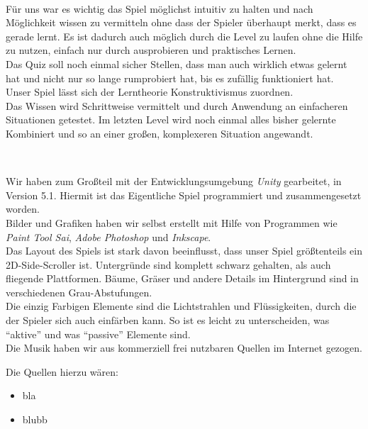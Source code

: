 \documentclass[10pt,a4paper,notitlepage]{report}
\begin{document}
	\\\par\medskip\Text
	Für uns war es wichtig das Spiel möglichst intuitiv zu halten und nach Möglichkeit wissen zu vermitteln ohne dass der Spieler überhaupt merkt, dass es gerade lernt. Es ist dadurch auch möglich durch die Level zu laufen ohne die Hilfe zu nutzen, einfach nur durch ausprobieren und praktisches Lernen.\\
	Das Quiz soll noch einmal sicher Stellen, dass man auch wirklich etwas gelernt hat und nicht nur so lange rumprobiert hat, bis es zufällig funktioniert hat.\\
	Unser Spiel lässt sich der Lerntheorie Konstruktivismus zuordnen.\\
	Das Wissen wird Schrittweise vermittelt und durch Anwendung an einfacheren Situationen getestet. Im letzten Level wird noch einmal alles bisher gelernte Kombiniert und so an einer großen, komplexeren Situation angewandt.\\\par\smallskip
	
	\\\par\medskip\Text
	Wir haben zum Großteil mit der Entwicklungsumgebung \textit{Unity} gearbeitet, in Version 5.1. Hiermit ist das Eigentliche Spiel programmiert und zusammengesetzt worden.\\
	Bilder und Grafiken haben wir selbst erstellt mit Hilfe von Programmen wie \textit{Paint Tool Sai}, \textit{Adobe Photoshop} und \textit{Inkscape}.\\
	Das Layout des Spiels ist stark davon beeinflusst, dass unser Spiel größtenteils ein 2D-Side-Scroller ist. Untergründe sind komplett schwarz gehalten, als auch fliegende Plattformen. Bäume, Gräser und andere Details im Hintergrund sind in verschiedenen Grau-Abstufungen.\\
	Die einzig Farbigen Elemente sind die Lichtstrahlen und Flüssigkeiten, durch die der Spieler sich auch einfärben kann. So ist es leicht zu unterscheiden, was \enquote{aktive} und was \enquote{passive} Elemente sind.\\
	Die Musik haben wir aus kommerziell frei nutzbaren Quellen im Internet gezogen.\\\par\smallskip
	Die Quellen hierzu wären:\\
	\begin{itemize}
		\item bla
		\item blubb
	\end{itemize}
	
\end{document}
